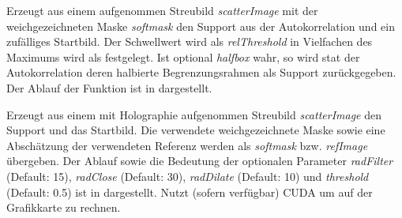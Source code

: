 	
\begin{description}[style=nextline]

	\item [\texttt{\textit{[start,support]}=SupportGeneric\textit{(scatterImage)}}]
	Erzeugt aus einem aufgenommen Streubild \textit{scatterImage} mit der weichgezeichneten Maske \textit{softmask} den Support aus der Autokorrelation und ein zufälliges Startbild. Der Schwellwert wird als \textit{relThreshold} in Vielfachen des Maximums wird als festgelegt. Ist optional \textit{halfbox} wahr, so wird stat der Autokorrelation deren halbierte Begrenzungsrahmen als Support zurückgegeben. Der Ablauf der Funktion ist in  dargestellt.
		
	\item [\texttt{\textit{[start,support,crossImage]}=SupportHolo\textit{(scatterImage,softmask,refImage)}}]
	Erzeugt aus einem mit Holographie aufgenommen Streubild \textit{scatterImage} den Support und das Startbild. Die verwendete weichgezeichnete Maske sowie eine Abschätzung der verwendeten Referenz werden als \textit{softmask} bzw. \textit{refImage} übergeben. Der Ablauf sowie die Bedeutung der optionalen Parameter \textit{radFilter} (Default: 15), \textit{radClose} (Default: 30), \textit{radDilate} (Default: 10) und \textit{threshold} (Default: 0.5) ist in  dargestellt. Nutzt (sofern verfügbar) CUDA um auf der Grafikkarte zu rechnen.
		

\end{description}
